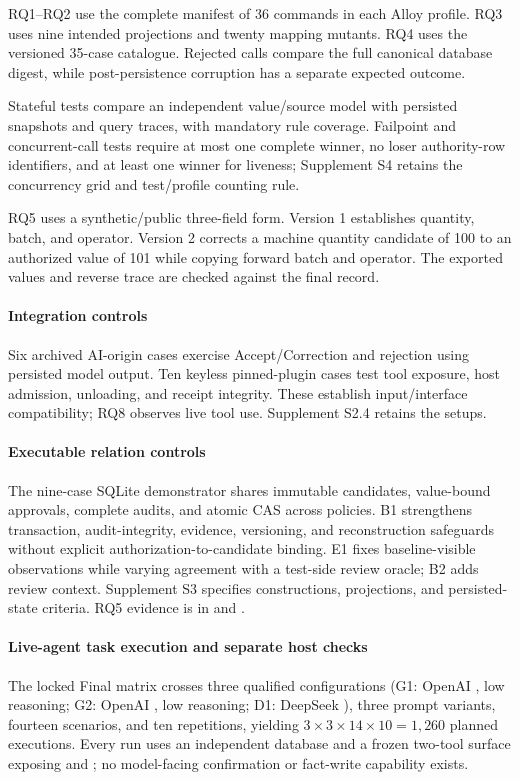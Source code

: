 RQ1--RQ2 use the complete manifest of 36 commands in each Alloy profile. RQ3 uses nine intended projections and twenty mapping mutants. RQ4 uses the versioned 35-case catalogue. Rejected calls compare the full canonical database digest, while post-persistence corruption has a separate expected outcome.

Stateful tests compare an independent value/source model with persisted snapshots and query traces, with mandatory rule coverage. Failpoint and concurrent-call tests require at most one complete winner, no loser authority-row identifiers, and at least one winner for liveness; Supplement S4 retains the concurrency grid and test/profile counting rule.

RQ5 uses a synthetic/public three-field form. Version 1 establishes quantity, batch, and operator. Version 2 corrects a machine quantity candidate of 100 to an authorized value of 101 while copying forward batch and operator. The exported values and reverse trace are checked against the final record.

\paragraph{Integration controls}
Six archived AI-origin cases exercise Accept/Correction and rejection using persisted model output. Ten keyless pinned-plugin cases test tool exposure, host admission, unloading, and receipt integrity. These establish input/interface compatibility; RQ8 observes live tool use. Supplement S2.4 retains the setups.

\paragraph{Executable relation controls}
The nine-case SQLite demonstrator shares immutable candidates, value-bound approvals, complete audits, and atomic CAS across policies. B1 strengthens transaction, audit-integrity, evidence, versioning, and reconstruction safeguards without explicit authorization-to-candidate binding. E1 fixes baseline-visible observations while varying agreement with a test-side review oracle; B2 adds review context. Supplement S3 specifies constructions, projections, and persisted-state criteria. RQ5 evidence is in  and .

\paragraph{Live-agent task execution and separate host checks}
The locked Final matrix crosses three qualified configurations (G1: OpenAI , low reasoning; G2: OpenAI , low reasoning; D1: DeepSeek ), three prompt variants, fourteen scenarios, and ten repetitions, yielding $3\times3\times14\times10=1{,}260$ planned executions. Every run uses an independent database and a frozen two-tool surface exposing  and ; no model-facing confirmation or fact-write capability exists.

